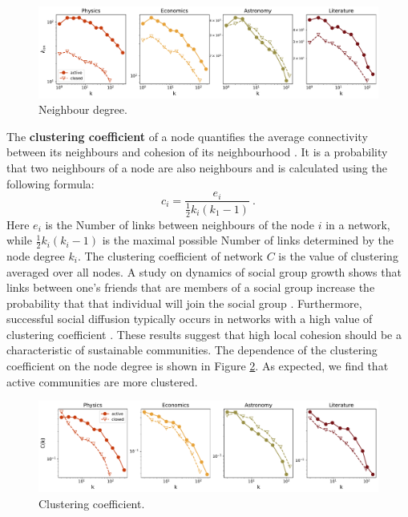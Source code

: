 \begin{figure}[!ht]
	\centering
	\includegraphics[width=\linewidth]{figures/stackexchange/neighdeg_fullnet.pdf}
	\caption{Neighbour degree.}
	\label{fig:fullneighdeg}
\end{figure}

The \textbf{clustering coefficient} of a node quantifies the average connectivity between its neighbours and cohesion of its neighbourhood \cite{boccaletti2006complex}. It is a probability that two neighbours of a node are also neighbours and is calculated using the following formula:
\begin{equation}
c_{i}=\frac{e_{i}}{\frac{1}{2}k_{i}(k_{1}-1)} \ .
\label{eq:clust}
\end{equation}
Here $e_{i}$ is the Number of links between neighbours of the node $i$ in a network, while $\frac{1}{2}k_{i}(k_{i}-1)$ is the maximal possible Number of links determined by the node degree $k_{i}$. The clustering coefficient of network $C$ is the value of clustering averaged over all nodes. A study on dynamics of social group growth shows that links between one’s friends that are members of a social group increase the probability that that individual will join the social group \cite{backstrom2006group}. Furthermore, successful social diffusion typically occurs in networks with a high value of clustering coefficient \cite{centola2007cascade}. These results suggest that high local cohesion should be a characteristic of sustainable communities. The dependence of the clustering coefficient on the node degree is shown in Figure \ref{fig:fullclustering}. As expected, we find that active communities are more clustered.

\begin{figure}[h]
	\centering
	\includegraphics[width=\linewidth]{figures/stackexchange/clustering_fullnet.pdf}
	\caption{Clustering coefficient.}
	\label{fig:fullclustering}
\end{figure}

